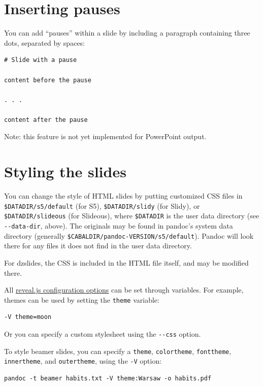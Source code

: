 \documentclass[
  b5paper
]{book}
\begin{document}
\section{Inserting pauses}\label{inserting-pauses}

You can add ``pauses'' within a slide by including a paragraph
containing three dots, separated by spaces:

\begin{verbatim}
# Slide with a pause

content before the pause

. . .

content after the pause
\end{verbatim}

Note: this feature is not yet implemented for PowerPoint output.

\section{Styling the slides}\label{styling-the-slides}

You can change the style of HTML slides by putting customized CSS files
in \texttt{\$DATADIR/s5/default} (for S5), \texttt{\$DATADIR/slidy} (for
Slidy), or \texttt{\$DATADIR/slideous} (for Slideous), where
\texttt{\$DATADIR} is the user data directory (see
\texttt{-\/-data-dir}, above). The originals may be found in pandoc's
system data directory (generally
\texttt{\$CABALDIR/pandoc-VERSION/s5/default}). Pandoc will look there
for any files it does not find in the user data directory.

For dzslides, the CSS is included in the HTML file itself, and may be
modified there.

All \href{https://revealjs.com/config/}{reveal.js configuration options}
can be set through variables. For example, themes can be used by setting
the \texttt{theme} variable:

\begin{verbatim}
-V theme=moon
\end{verbatim}

Or you can specify a custom stylesheet using the \texttt{-\/-css}
option.

To style beamer slides, you can specify a \texttt{theme},
\texttt{colortheme}, \texttt{fonttheme}, \texttt{innertheme}, and
\texttt{outertheme}, using the \texttt{-V} option:

\begin{verbatim}
pandoc -t beamer habits.txt -V theme:Warsaw -o habits.pdf
\end{verbatim}
\end{document}
